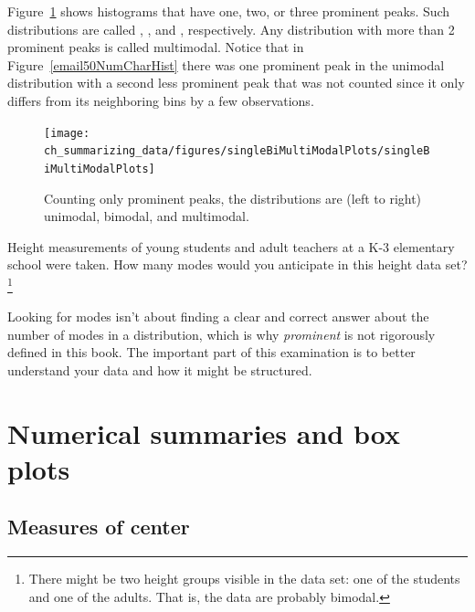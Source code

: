 Figure~\ref{singleBiMultiModalPlots} shows histograms that have one, two, or three prominent peaks. Such distributions are called , , and , respectively. Any distribution with more than 2 prominent peaks is called multimodal. Notice that in Figure~\ref{email50NumCharHist} there was one prominent peak in the unimodal distribution with a second less prominent peak that was not counted since it only differs from its neighboring bins by a few observations.

\begin{figure}[h]
   \centering
   \texttt{[image: ch\_summarizing\_data/figures/singleBiMultiModalPlots/singleBiMultiModalPlots]}
   \caption{Counting only prominent peaks, the distributions are (left to right) unimodal, bimodal, and multimodal.}
   \label{singleBiMultiModalPlots}
\end{figure}

\begin{exercise}
Height measurements of young students and adult teachers at a K-3 elementary school were taken. How many modes would you anticipate in this height data set?\footnote{There might be two height groups visible in the data set: one of the students and one of the adults. That is, the data are probably bimodal.}
\end{exercise}

\begin{tipBox}{
Looking for modes isn't about finding a clear and correct answer about the number of modes in a distribution, which is why \emph{prominent} is not rigorously defined in this book. The important part of this examination is to better understand your data and how it might be structured.}
\end{tipBox}


\section{Numerical summaries and box plots}
\label{numericalSummariesAndBoxPlots}

\subsection{Measures of center}
\label{center}

